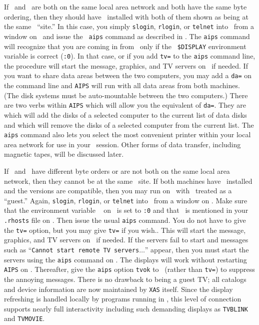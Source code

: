      If \Ser\ and \MyH\ are both on the same local area network and
both have the same byte ordering, then they should have \AIPS\
installed with both of them shown as being at the same \AIPS\
``site.''  In this case, you simply {\tt slogin}, {\tt rlogin}, or
{\tt telnet} into \Ser\ from a window on \MyH\ and issue the {\tt
aips} command as described in \Sec{stAIPS}.  The {\tt aips} command
will recognize that you are coming in from \MyH\ only if the {\tt
\$DISPLAY} environment variable is correct ({\tt \MyH:0})\@.  In that
case, or if you add {\tt tv=\MyH} to the {\tt aips} command line, the
procedure will start the message, graphics, and TV servers on \MyH\ if
needed.  If you want to share data areas between the two computers,
you may add a {\tt da=\MyH} on the command line and {\tt AIPS} will
run with all data areas from both machines. (The disk systems must be
auto-mountable between the two computers.)  There are two verbs
within  {\tt AIPS} which will allow you the equivalent of {\tt da=}.
They are {\tt \tndx{ADDDISK}} which will add the disks of a selected
computer to the current list of data disks and {\tt \tndx{REMDISK}}
which will remove the disks of a selected computer from the current
list.  The {\tt aips} command also lets you select the most convenient
printer within your local area network for use in your \AIPS\ session.
Other forms of data transfer, including magnetic tapes, will be
discussed later.\Iodx{remote user}

     If \Ser\ and \MyH\ have different byte orders or are not both on
the same local area network, then they cannot be at the same \AIPS\
site.  If both machines have \AIPS\ installed and the versions are
compatible, then you may run on \Ser\ with \MyH\ treated as a ``guest.''
Again, {\tt slogin}, {\tt rlogin}, or {\tt telnet} into \Ser\ from a
window on \MyH.  Make sure that the environment variable {\tt
\tndx{DISPLAY}} on \Ser\ is set to {\tt \MyH:0} and that \Ser\ is
mentioned in your {\tt .rhosts} file on \MyH.  Then issue the usual
{\tt aips} command. You do not have to give the {\tt tv=} option, but
you may give {\tt tv=\MyH} if you wish.. This will start the message,
graphics, and TV servers on \MyH\ if needed.  If the servers fail to
start and messages such as ``{\tt Cannot start remote TV
servers}$\ldots$'' appear, then you must start the servers using the
{\tt aips} command on \MyH.  The displays will work without restarting
{\tt AIPS} on \Ser.  Thereafter, give the {\tt aips} option {\tt tvok}
to \Ser\ (rather than {\tt tv=}) to suppress the annoying messages.
There is no drawback to being a guest TV; all catalogs and device
information are now maintained by {\tt XAS} itself.  Since the display
refreshing is handled locally by programs running in \MyH, this level
of connection supports nearly full interactivity including such
demanding displays as {\tt TVBLINK} and {\tt TVMOVIE}\@.

